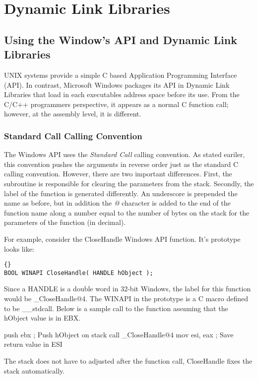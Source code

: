 \chapter{Dynamic Link Libraries}

\section{Using the Window's API and Dynamic Link Libraries}

UNIX systems provide a simple C based Application Programming
Interface (API).  In contrast, Microsoft Windows\texttrademark
\hspace{0.5em} packages its API in Dynamic Link Libraries that load in
each executables address space before its use. From the C/C++
programmers perspective, it appears as a normal C function call;
however, at the assembly level, it is different.

\subsection{Standard Call Calling Convention}
The Windows API uses the \emph{Standard Call} calling convention. As stated eariler, this
convention pushes the arguments in reverse order just as the standard
C calling convention. However, there are two important
differences. First, the subroutine is responsible for clearing the
parameters from the stack. Secondly, the label of the function is
generated differently. An underscore is prepended the name as before,
but in addition the \emph{@} character is added to the end of the
function name along a number equal to the number of bytes on the stack
for the parameters of the function (in decimal).

For example, consider the {\code CloseHandle} Windows API function. It's prototype
looks like:
\begin{lstlisting}[stepnumber=0]{}
BOOL WINAPI CloseHandle( HANDLE hObject );
\end{lstlisting}
Since a {\code HANDLE} is a double word in 32-bit Windows, the label
for this function would be {\code \_CloseHandle@4}. The {\code WINAPI}
in the prototype is a C macro defined to be {\code \_\_stdcall}. Below
is a sample call to the function assuming that the {\code hObject}
value is in {\code EBX}.
\begin{AsmCodeListing}[frame=single]
  push  ebx             ; Push hObject on stack
  call  _CloseHandle@4
  mov   esi, eax        ; Save return value in ESI
\end{AsmCodeListing}
The stack does not have to adjusted after the function call, {\code CloseHandle}
fixes the stack automatically.

